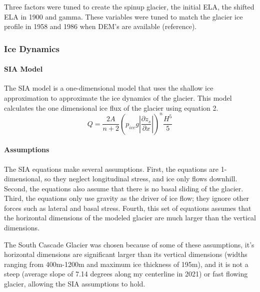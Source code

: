 \documentclass{article}
\begin{document}
Three factors were tuned to create the spinup glacier, the initial ELA, the shifted ELA in 1900 and gamma. These variables were tuned to 
match the glacier ice profile in 1958 and 1986 when DEM's are available (reference). 

\subsubsection{Ice Dynamics}
\paragraph{SIA Model}

The SIA model is a one-dimensional model that uses the shallow ice approximation to approximate the ice dynamics of the glacier. This model 
calculates the one dimensional ice flux of the glacier using equation 2. 
\begin{equation}Q=\frac{2A}{n+2}(p_{ice}g|\frac{\partial z_s}{\partial x}|)^n\frac{H^5}{5}\end{equation}
\paragraph{Assumptions}

The SIA equations make several assumptions. First, the equations are 1-dimensional, so they neglect longitudinal stress, and ice only flows downhill. Second, the equations 
also assume that there is no basal sliding of the glacier. Third, the equations only use gravity as the driver of ice flow; they ignore other 
forces such as lateral and basal stress. Fourth, this set of equations assumes that the horizontal dimensions of the modeled glacier are much 
larger than the vertical dimensions.

The South Cascade Glacier was chosen because of some of these assumptions, it's horizontal dimensions are significant larger than its vertical 
dimensions (widths ranging from 400m-1200m and maximum ice thickness of 195m), and it is not a steep (average slope of 7.14 degrees along my 
centerline in 2021) or fast flowing glacier, allowing the SIA assumptions to hold.
\end{document}
